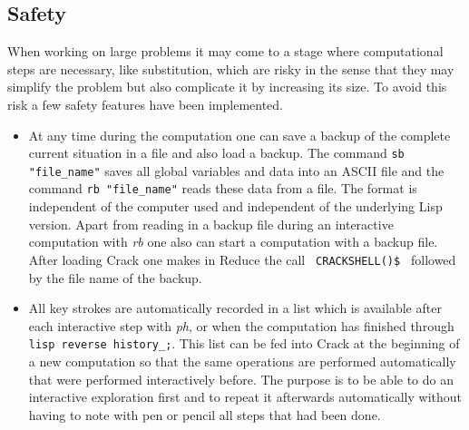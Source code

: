 \documentclass[12pt]{article}
\begin{document}
\subsection{Safety}
  When working on large problems it may come to a stage where computational
  steps are necessary, like substitution, which are risky in the sense
  that they may simplify the problem but also complicate it by
  increasing its size. To avoid this risk a few safety features have
  been implemented. 
  \begin{itemize}
  \item At any time during the computation one can save a backup of
    the complete current situation in a file and also load a backup. 
    The command {\tt sb "file\_name"} saves all global variables and
    data into an ASCII file and the command {\tt rb "file\_name"} reads 
    these data from a file. The format is independent of the computer 
    used and independent of the underlying {\sc Lisp} version. 
    Apart from reading in a backup file during an interactive
    computation with {\em rb} one also can start a computation with
    a backup file. After loading {\sc Crack} one makes in {\sc Reduce}
    the call \verb+ CRACKSHELL()$ + %
    followed by the file name of the backup.
  \item All key strokes are automatically recorded in a list which is
    available after each interactive step with {\em ph}, or when the 
    computation has finished through {\tt lisp reverse history\_;}.
    This list can be fed into {\sc Crack} at the beginning
    of a new computation so that the same operations are performed
    automatically that were performed interactively before. The
    purpose is to be able to do an interactive exploration first and
    to repeat it afterwards automatically without having to note with
    pen or pencil all steps that had been done.  
    

\end{itemize}
\end{document}
